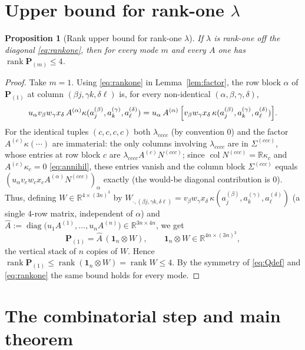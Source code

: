 \documentclass[12pt]{article}
\DeclareMathOperator{\diag}{diag}
\DeclareMathOperator{\rank}{rank}
\DeclareMathOperator{\col}{col}
\newcommand{\bR}{\mathbb{R}}
\newtheorem{proposition}{Proposition}
\theoremstyle{definition}
\begin{document}
\section{Upper bound for rank-one $\lambda$}

\begin{proposition}[Rank upper bound for rank-one $\lambda$]\label{prop:upper}
If $\lambda$ is rank-one off the diagonal \eqref{eq:rankone}, then for every mode
$m$ and every $A$ one has $\rank\mathbf P_{(m)}\le 4$.
\end{proposition}

\begin{proof}
Take $m=1$.  Using \eqref{eq:rankone} in Lemma~\ref{lem:factor}, the row block
$\alpha$ of $\mathbf P_{(1)}$ at column $(\beta j,\gamma k,\delta\ell)$ is, for every
non-identical $(\alpha,\beta,\gamma,\delta)$,
\[
u_\alpha v_\beta w_\gamma x_\delta\,A^{(\alpha)}\kappa(a^{(\beta)}_j,a^{(\gamma)}_k,a^{(\delta)}_\ell)
=u_\alpha\,A^{(\alpha)}\,\Bigl[v_\beta w_\gamma x_\delta\,\kappa(a^{(\beta)}_j,a^{(\gamma)}_k,a^{(\delta)}_\ell)\Bigr].
\]
For the identical tuples $(c,c,c,c)$ both $\lambda_{cccc}$ (by convention $0$) and the
factor $A^{(c)}\kappa(\cdots)$ are immaterial: the only columns involving
$\lambda_{cccc}$ are in $\Sigma^{(ccc)}$, whose entries at row block $c$ are
$\lambda_{cccc}A^{(c)}N^{(ccc)}$; since $\col N^{(ccc)}=\bR\kappa_c$ and
$A^{(c)}\kappa_c=0$ \eqref{eq:annihil}, these entries vanish and the column block
$\Sigma^{(ccc)}$ equals $(u_\alpha v_cw_cx_c A^{(\alpha)}N^{(ccc)})_\alpha$ exactly
(the would-be diagonal contribution is $0$).  Thus, defining
$W\in\bR^{4\times(3n)^3}$ by
$W_{\cdot,(\beta j,\gamma k,\delta\ell)}=v_\beta w_\gamma x_\delta\,
\kappa(a^{(\beta)}_j,a^{(\gamma)}_k,a^{(\delta)}_\ell)$ (a single $4$-row matrix,
independent of $\alpha$) and
$\widehat A:=\diag\bigl(u_1A^{(1)},\dots,u_nA^{(n)}\bigr)\in\bR^{3n\times4n}$, we get
\begin{equation}\label{eq:rank4factor}
\mathbf P_{(1)}=\widehat A\,(\mathbf 1_n\otimes W),\qquad
\mathbf 1_n\otimes W\in\bR^{4n\times(3n)^3},
\end{equation}
the vertical stack of $n$ copies of $W$.  Hence
$\rank\mathbf P_{(1)}\le\rank(\mathbf 1_n\otimes W)=\rank W\le4$.  By the symmetry of
\eqref{eq:Qdef} and \eqref{eq:rankone} the same bound holds for every mode.
\end{proof}

\section{The combinatorial step and main theorem}
\end{document}
